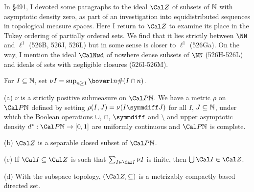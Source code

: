 \discrpage


\def\chaptername{Cardinal functions of measure theory}
\def\sectionname{Asymptotic density zero}


In \S491, I devoted some paragraphs to the ideal $\Cal Z$ of subsets
of $\Bbb N$ with asymptotic density zero, as part of an investigation
into equidistributed sequences
in topological measure spaces.   Here I return to $\Cal Z$ to examine
its place in the Tukey ordering of partially ordered sets.   We find
that it lies strictly between
$\NN$ and $\ell^1$ (526B, 526J, 526L)
but in some sense is closer to $\ell^1$
(526Ga).   On the way, I mention the ideal $\CalNwd$
of nowhere dense subsets of $\NN$
(526H-526L) %
and ideals of sets with negligible closures
(526I-526M). %

 For $I\subseteq\Bbb N$, set
$\nu I=\sup_{n\ge 1}\bover1n\#(I\cap n)$.

(a) $\nu$ is a strictly positive submeasure on $\Cal P\Bbb N$.   We have a
metric $\rho$ on $\Cal P\Bbb N$
defined by setting $\rho(I,J)=\nu(I\symmdiff J)$ for all $I$,
$J\subseteq\Bbb N$, under which the Boolean operations $\cup$, $\cap$,
$\symmdiff$ and $\setminus$ and upper asymptotic density
$d^*:\Cal P\Bbb N\to[0,1]$ are uniformly continuous and
$\Cal P\Bbb N$ is complete.

(b) $\Cal Z$ is a separable closed subset of $\Cal P\Bbb N$.

(c) If $\Cal I\subseteq\Cal Z$ is such that $\sum_{I\in\Cal I}\nu I$ is
finite, then $\bigcup\Cal I\in\Cal Z$.

(d) With the subspace topology, $(\Cal Z,\subseteq)$
is a metrizably compactly based directed set.

